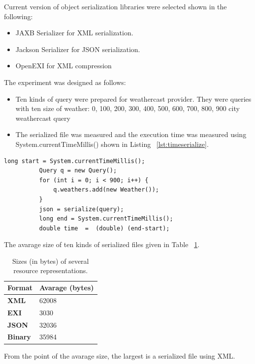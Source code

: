 Current version of object serialization libraries were selected shown in the following:
\begin{itemize}
\item 	JAXB Serializer for XML serialization.
\item   Jackson Serializer for JSON serialization.
\item 	OpenEXI for XML compression
\end{itemize}
The experiment was  designed as follows:
\begin{itemize}
\item 	Ten kinds of query were prepared for weathercast provider. They were queries with ten size of weather: 0, 100, 200, 300, 400, 500, 600, 700, 800, 900 city weathercast query
\item   The serialized file was measured and the execution time was measured using System.currentTimeMillis() shown in Listing ~\ref{lst:timeserialize}.
\end{itemize}

\begin{lstlisting}[caption=Serialization program for testing, label=lst:timeserialize]
          long start = System.currentTimeMillis();
          Query q = new Query();
          for (int i = 0; i < 900; i++) {
              q.weathers.add(new Weather());
          }
          json = serialize(query);
          long end = System.currentTimeMillis();
          double time  =  (double) (end-start);
\end{lstlisting}

The avarage size of ten kinds of serialized files given in Table ~\ref{tab:binaryyy}.
\begin{table}
\centering
\begin{tabular}{ p{5.50cm} p{5.50cm} }
\toprule
\multicolumn{1}{l}{\textbf{Format}} & \textbf{Avarage (bytes)}\\
\midrule
\textbf{XML}    & 62008\\
\textbf{EXI}    & 3030\\
\textbf{JSON}   & 32036\\
\textbf{Binary} & 35984\\

\bottomrule
\end{tabular}
\caption[Sizes (in bytes) of several resource representations.]{Sizes (in bytes) of several resource representations.}
\label{tab:binaryyy}
\end{table}

From the point of the avarage size, the largest is a serialized file using XML.

